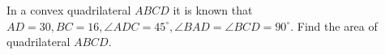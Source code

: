 In a convex quadrilateral $ABCD$ it is known that $AD=30, BC=16, \angle ADC=45^{\circ}, \angle BAD=\angle BCD=90^{\circ}$. Find the area of quadrilateral $ABCD$.
